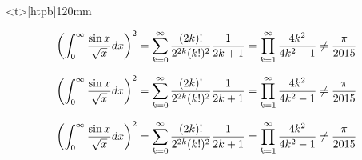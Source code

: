 \clearpage
\begin{minipage}<t>[htpb]{120mm}
		\vspace*{10mm}
			{\normalsize 
				\[ \sampleEq \]\par}

			{\Large 
				\[ \sampleEq \]\par}

			{\footnotesize
				\[ \sampleEq \]\par}
\end{minipage}


\endinput